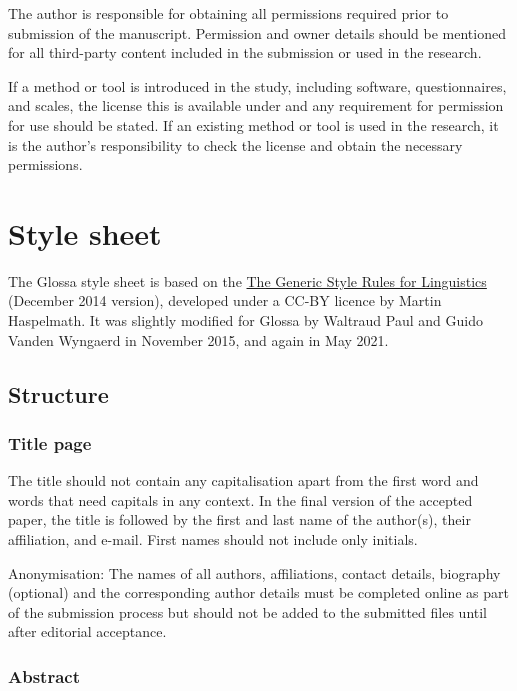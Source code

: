 \documentclass[charis,linguex]{glossa}
\begin{document}
The author is responsible for obtaining all permissions required prior to submission of the manuscript. Permission and owner details should be mentioned for all third-party content included in the submission or used in the research.

If a method or tool is introduced in the study, including software, questionnaires, and scales, the license this is available under and any requirement for permission for use should be stated. If an existing method or tool is used in the research, it is the author's responsibility to check the license and obtain the necessary permissions. %


\section{Style sheet}\label{ss}

The Glossa style sheet is based on the \href{http://www.eva.mpg.de/linguistics/past-research-resources/resources/generic-style-rules.html}{The Generic Style Rules for Linguistics} (December 2014 version), developed under a CC-BY licence by Martin Haspelmath. It was slightly modified for Glossa by Waltraud Paul and Guido Vanden Wyngaerd in November 2015, and again in May 2021. 

\subsection{Structure}

\subsubsection{Title page}

The title should not contain any capitalisation apart from the first word and words that need capitals in any context. In the final version of the accepted paper, the title is followed by the first and last name of the author(s), their affiliation, and e-mail. First names should not include only initials.  

Anonymisation: The names of all authors, affiliations, contact details, biography (optional) and the corresponding author details must be completed online as part of the submission process but should not be added to the submitted files until after editorial acceptance.

\subsubsection{Abstract}
\end{document}
